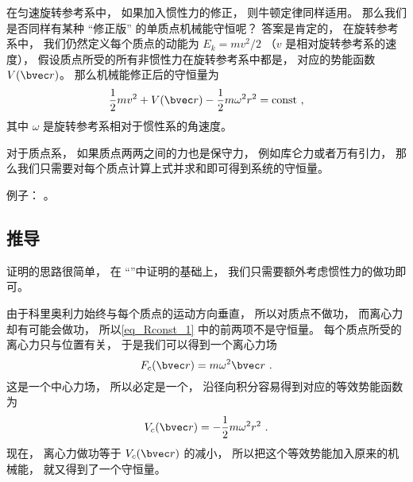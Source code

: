 

在匀速旋转参考系中， 如果加入惯性力的修正， 则牛顿定律同样适用。 那么我们是否同样有某种 “修正版” 的单质点机械能守恒呢？ 答案是肯定的， 在旋转参考系中， 我们仍然定义每个质点的动能为 $E_k = mv^2/2$ （$v$ 是相对旋转参考系的速度）， 假设质点所受的所有非惯性力在旋转参考系中都是， 对应的势能函数 $V(\bvec r)$。 那么机械能修正后的守恒量为
\begin{equation}\label{eq_Rconst_1}
\frac{1}{2}m v^2 + V(\bvec r) - \frac{1}{2}m\omega^2 r^2 = \text{const}~,
\end{equation}
其中 $\omega$ 是旋转参考系相对于惯性系的角速度。

对于质点系， 如果质点两两之间的力也是保守力， 例如库仑力或者万有引力， 那么我们只需要对每个质点计算上式并求和即可得到系统的守恒量。

例子： 。

\subsection{推导}
证明的思路很简单， 在 “”中证明的基础上， 我们只需要额外考虑惯性力的做功即可。

由于科里奥利力始终与每个质点的运动方向垂直， 所以对质点不做功， 而离心力却有可能会做功， 所以\autoref{eq_Rconst_1} 中的前两项不是守恒量。 每个质点所受的离心力只与位置有关， 于是我们可以得到一个离心力场
\begin{equation}
F_c(\bvec r) = m\omega^2 \bvec r~.
\end{equation}
 这是一个中心力场， 所以必定是一个， 沿径向积分容易得到对应的等效势能函数为
\begin{equation}
V_c(\bvec r) = -\frac{1}{2}m\omega^2 r^2~.
\end{equation}
现在， 离心力做功等于 $V_c(\bvec r)$ 的减小， 所以把这个等效势能加入原来的机械能， 就又得到了一个守恒量。
